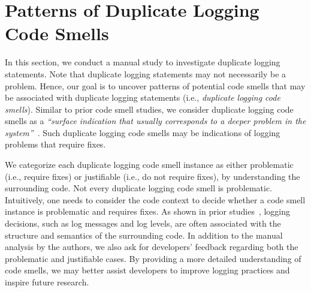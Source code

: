 \section{Patterns of Duplicate Logging Code Smells}
\label{sec:manual}


In this section, we conduct a manual study to investigate duplicate logging statements. Note that duplicate logging statements may not necessarily be a problem. Hence, our goal is to uncover patterns of potential code smells that may be associated with duplicate logging statements (i.e., {\em duplicate logging code smells}). %
Similar to prior code smell studies, we consider duplicate logging code smells as a {\em ``surface indication that usually corresponds to a deeper problem in the system''}~\cite{budgen2003software, fowler1999refactoring}. Such duplicate logging code smells may be indications of logging problems that require fixes.

We categorize each duplicate logging code smell instance as either problematic (i.e., require fixes) or justifiable (i.e., do not require fixes), by understanding the surrounding code.
Not every duplicate logging code smell is problematic. Intuitively, one needs to consider the code context to decide whether a code smell instance is problematic and requires fixes. As shown in prior studies~\cite{Zhu:2015:LLH:2818754.2818807, Fu:2014:DLE:2591062.2591175, Li2018}, logging decisions, such as log messages and log levels, are often associated with the structure and semantics of the surrounding code.
In addition to the manual analysis by the authors, we also ask for developers' feedback regarding both the problematic and justifiable cases.
By providing a more detailed understanding of code smells, we may better assist developers to improve logging practices and inspire future research.





